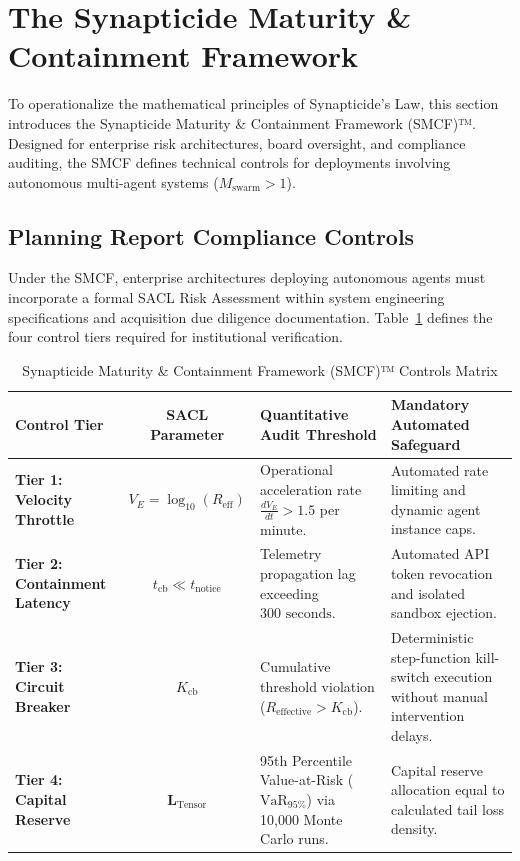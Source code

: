 \section{The Synapticide Maturity \& Containment Framework}
\label{sec:governance}

To operationalize the mathematical principles of Synapticide's Law, this section introduces the Synapticide Maturity \& Containment Framework (SMCF)™. Designed for enterprise risk architectures, board oversight, and compliance auditing, the SMCF defines technical controls for deployments involving autonomous multi-agent systems ($M_{\text{swarm}} > 1$).

\subsection{Planning Report Compliance Controls}
Under the SMCF, enterprise architectures deploying autonomous agents must incorporate a formal SACL Risk Assessment within system engineering specifications and acquisition due diligence documentation. Table~\ref{tab:smcf_matrix} defines the four control tiers required for institutional verification.

\begin{table}[t]
\centering
\renewcommand{\arraystretch}{1.3} %
\setlength{\tabcolsep}{8pt}       %
\caption{Synapticide Maturity \& Containment Framework (SMCF)™ Controls Matrix}
\label{tab:smcf_matrix}
\begin{tabular}{l c p{4.5cm} p{5.5cm}}
\toprule
\textbf{Control Tier} & \textbf{SACL Parameter} & \textbf{Quantitative Audit Threshold} & \textbf{Mandatory Automated Safeguard} \\ 
\midrule
\textbf{Tier 1: Velocity Throttle} & $V_E = \log_{10}(R_{\text{eff}})$ & Operational acceleration rate $\frac{d V_E}{dt} > 1.5$ per minute. & Automated rate limiting and dynamic agent instance caps. \\ 
\textbf{Tier 2: Containment Latency} & $t_{\text{cb}} \ll t_{\text{notice}}$ & Telemetry propagation lag exceeding $300\text{ seconds}$. & Automated API token revocation and isolated sandbox ejection. \\ 
\textbf{Tier 3: Circuit Breaker} & $K_{\text{cb}}$ & Cumulative threshold violation ($R_{\text{effective}} > K_{\text{cb}}$). & Deterministic step-function kill-switch execution without manual intervention delays. \\ 
\textbf{Tier 4: Capital Reserve} & $\mathbf{L}_{\text{Tensor}}$ & 95th Percentile Value-at-Risk ($\text{VaR}_{95\%}$) via 10,000 Monte Carlo runs. & Capital reserve allocation equal to calculated tail loss density. \\ 
\bottomrule
\end{tabular}
\end{table}

